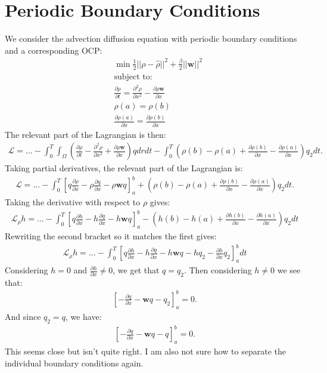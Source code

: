 \documentclass[11pt, a4paper]{article}
\theoremstyle{definition}
\newcommand{\w}{\mathbf{w}}
\newcommand{\hr}{\widehat \rho}
\begin{document}
	\section{Periodic Boundary Conditions}
	We consider the advection diffusion equation with periodic boundary conditions and a corresponding OCP:
	\begin{align*}
		&\min \frac{1}{2}|| \rho - \hr||^2 + \frac{\beta}{2}||\w||^2\\
		&\text{subject to:}\\
		&\frac{\partial \rho}{\partial t} = \frac{\partial^2 \rho}{\partial x^2} - \frac{\partial \rho \w}{\partial x}\\
		& \rho(a) = \rho(b)\\
		& \frac{\partial \rho(a)}{\partial x} = \frac{\partial \rho(b)}{\partial x} 
	\end{align*}
	The relevant part of the Lagrangian is then:
	\begin{align*}
		\mathcal{L} = ... -\int_0^T \int_\Omega \left(\frac{\partial \rho}{\partial t} - \frac{\partial^2 \rho}{\partial x^2} + \frac{\partial \rho \w}{\partial x}\right)q dr dt - \int_0^T \left(\rho(b) - \rho(a) + \frac{\partial \rho(b)}{\partial x} - \frac{\partial \rho(a)}{\partial x}\right)q_2dt.
	\end{align*}
	Taking partial derivatives, the relevant part of the Lagrangian is:
	\begin{align*}
		\mathcal{L} = ... - \int_0^T \left[q \frac{\partial \rho}{\partial x} - \rho\frac{\partial q}{\partial x} - \rho \w q\right]_a^b +
		\left(\rho(b) - \rho(a) + \frac{\partial \rho(b)}{\partial x} - \frac{\partial \rho(a)}{\partial x}\right)q_2dt.
	\end{align*}
	Taking the derivative with respect to $\rho$ gives:
	\begin{align*}
		\mathcal{L}_\rho h = ... - \int_0^T \left[q \frac{\partial h}{\partial x} - h\frac{\partial q}{\partial x} - h \w q\right]_a^b -
		\left(h(b) - h(a) + \frac{\partial h(b)}{\partial x} - \frac{\partial h(a)}{\partial x}\right)q_2dt
	\end{align*}
	Rewriting the second bracket so it matches the first gives:
	\begin{align*}
		\mathcal{L}_\rho h = ... - \int_0^T \left[q \frac{\partial h}{\partial x} - h\frac{\partial q}{\partial x} - h \w q - h q_2 - \frac{\partial h}{\partial x}q_2 \right]_a^b dt
	\end{align*}
	Considering $h = 0$ and $\frac{\partial h}{\partial x} \neq 0$, we get that $q = q_2$.
	Then considering $h \neq 0$ we see that:
	\begin{align*}
		\left[ - \frac{\partial q}{\partial x} -  \w q -  q_2  \right]_a^b = 0.
	\end{align*}
	And since $q_2 = q$, we have:
	\begin{align*}
		\left[ - \frac{\partial q}{\partial x} -  \w q -  q  \right]_a^b = 0.
	\end{align*}
	This seems close but isn't quite right. I am also not sure how to separate the individual boundary conditions again.
	
\end{document}
